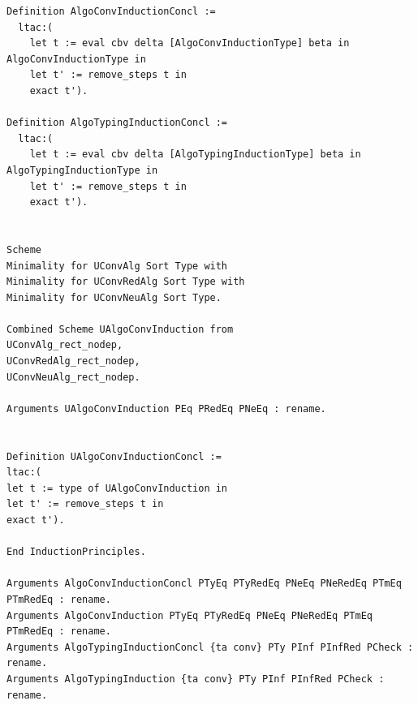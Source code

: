 \documentclass[10pt,a4paper]{amsart}
\begin{document}
\begin{lstlisting}
Definition AlgoConvInductionConcl :=
  ltac:(
    let t := eval cbv delta [AlgoConvInductionType] beta in AlgoConvInductionType in
    let t' := remove_steps t in
    exact t').

Definition AlgoTypingInductionConcl :=
  ltac:(
    let t := eval cbv delta [AlgoTypingInductionType] beta in AlgoTypingInductionType in
    let t' := remove_steps t in
    exact t').


Scheme 
Minimality for UConvAlg Sort Type with
Minimality for UConvRedAlg Sort Type with
Minimality for UConvNeuAlg Sort Type.

Combined Scheme UAlgoConvInduction from
UConvAlg_rect_nodep,
UConvRedAlg_rect_nodep,
UConvNeuAlg_rect_nodep.

Arguments UAlgoConvInduction PEq PRedEq PNeEq : rename.


Definition UAlgoConvInductionConcl :=
ltac:(
let t := type of UAlgoConvInduction in
let t' := remove_steps t in
exact t').

End InductionPrinciples.

Arguments AlgoConvInductionConcl PTyEq PTyRedEq PNeEq PNeRedEq PTmEq PTmRedEq : rename.
Arguments AlgoConvInduction PTyEq PTyRedEq PNeEq PNeRedEq PTmEq PTmRedEq : rename.
Arguments AlgoTypingInductionConcl {ta conv} PTy PInf PInfRed PCheck : rename.
Arguments AlgoTypingInduction {ta conv} PTy PInf PInfRed PCheck : rename.
\end{lstlisting}
\end{document}
